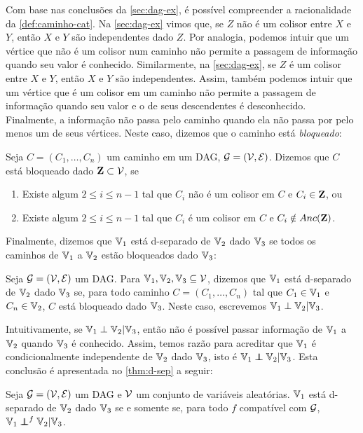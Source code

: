 Com base nas conclusões da \cref{sec:dag-ex},
é possível compreender a racionalidade
da \cref{def:caminho-cat}.
Na \cref{sec:dag-ex} vimos que,
se $Z$ não é um colisor entre
$X$ e $Y$, então
$X$ e $Y$ são independentes dado $Z$.
Por analogia, podemos intuir que um vértice que
não é um colisor num caminho
não permite a passagem de informação
quando seu valor é conhecido.
Similarmente, na \cref{sec:dag-ex},
se $Z$ é um colisor entre
$X$ e $Y$, então 
$X$ e $Y$ são independentes.
Assim, também podemos intuir que um vértice que
é um colisor em um caminho não permite
a passagem de informação quando seu valor e
o de seus descendentes é desconhecido.
Finalmente, a informação não passa pelo caminho quando
ela não passa por pelo menos um de seus vértices.
Neste caso, dizemos que o caminho está \textit{bloqueado}:

\begin{definition}
 \label{def:caminho-bloq}
 Seja $C = (C_1,\ldots,C_n)$ um caminho 
 em um DAG, ${\mathcal G} = ({\mathcal V},{\mathcal E})$.
 Dizemos que $C$ está bloqueado dado ${\mathbf{Z}} \subset {\mathcal V}$, se
 \begin{enumerate}
  \item Existe algum $2 \leq i \leq n-1$ tal que
  $C_i$ não é um colisor em $C$ e $C_{i} \in {\mathbf{Z}}$, ou
  \item Existe algum $2 \leq i \leq n-1$ tal que 
  $C_i$ é um colisor em $C$ e $C_{i} \notin Anc({\mathbf{Z}})$.
 \end{enumerate}
\end{definition}

Finalmente, dizemos que ${\mathbb V}_1$ está d-separado de ${\mathbb V}_2$
dado ${\mathbb V}_3$ se todos os caminhos de 
${\mathbb V}_1$ a ${\mathbb V}_2$ estão bloqueados dado ${\mathbb V}_3$:

\begin{definition}
 \label{def:d-sep}
 Seja ${\mathcal G} = ({\mathcal V}, {\mathcal E})$ um DAG. 
 Para ${\mathbb V}_1,{\mathbb V}_2,{\mathbb V}_3 \subseteq {\mathcal V}$, dizemos que
 ${\mathbb V}_1$ está d-separado de ${\mathbb V}_2$ dado ${\mathbb V}_3$ se,
 para todo caminho $C = (C_1,\ldots,C_n)$ tal que
 $C_1 \in {\mathbb V}_1$ e $C_n \in {\mathbb V}_2$,
 $C$ está bloqueado dado ${\mathbb V}_3$.
 Neste caso, escrevemos ${\mathbb V}_1 \perp {\mathbb V}_2 | {\mathbb V}_3$.
\end{definition}

Intuitivamente, se ${\mathbb V}_1 \perp {\mathbb V}_2 | {\mathbb V}_3$, então 
não é possível passar informação de ${\mathbb V}_1$ a ${\mathbb V}_2$ quando
${\mathbb V}_3$ é conhecido.
Assim, temos razão para acreditar que
${\mathbb V}_1$ é condicionalmente independente de ${\mathbb V}_2$ dado ${\mathbb V}_3$,
isto é ${\mathbb V}_1 \perp\!\!\!\!\perp {\mathbb V}_2 | {\mathbb V}_3$.
Esta conclusão é apresentada no 
\cref{thm:d-sep} a seguir:

\begin{theorem}
 \label{thm:d-sep}
 Seja ${\mathcal G} = ({\mathcal V}, {\mathcal E})$ um DAG e
 ${\mathcal V}$ um conjunto de variáveis aleatórias.
 ${\mathbb V}_1$ está d-separado de ${\mathbb V}_2$ dado ${\mathbb V}_3$
 se e somente se, para todo $f$ compatível com ${\mathcal G}$,
 ${\mathbb V}_1 \perp\!\!\!\!\perp^f {\mathbb V}_2 | {\mathbb V}_3$.
\end{theorem}

